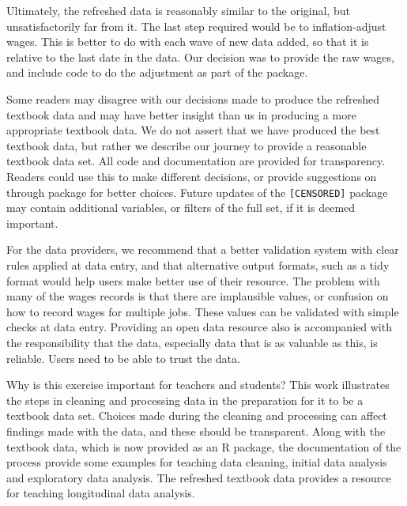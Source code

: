 \documentclass{article}
\begin{document}
Ultimately, the refreshed data is reasonably similar to the original, but unsatisfactorily far from it. The last step required would be to inflation-adjust wages. This is better to do with each wave of new data added, so that it is relative to the last date in the data. Our decision was to provide the raw wages, and include code to do the adjustment as part of the package.

Some readers may disagree with our decisions made to produce the refreshed textbook data and may have better insight than us in producing a more appropriate textbook data. We do not assert that we have produced the best textbook data, but rather we describe our journey to provide a reasonable textbook data set. All code and documentation are provided for transparency. Readers could use this to make different decisions, or provide suggestions on through package for better choices. Future updates of the \texttt{[CENSORED]} package may contain additional variables, or filters of the full set, if it is deemed important.

For the data providers, we recommend that a better validation system with clear rules applied at data entry, and that alternative output formats, such as a tidy format would help users make better use of their resource. The problem with many of the wages records is that there are implausible values, or confusion on how to record wages for multiple jobs. These values can be validated with simple checks at data entry. Providing an open data resource also is accompanied with the responsibility that the data, especially data that is as valuable as this, is reliable. Users need to be able to trust the data.

Why is this exercise important for teachers and students? This work illustrates the steps in cleaning and processing data in the preparation for it to be a textbook data set. Choices made during the cleaning and processing can affect findings made with the data, and these should be transparent. Along with the textbook data, which is now provided as an R package, the documentation of the process provide some examples for teaching data cleaning, initial data analysis and exploratory data analysis. The refreshed textbook data provides a resource for teaching longitudinal data analysis.
\end{document}
